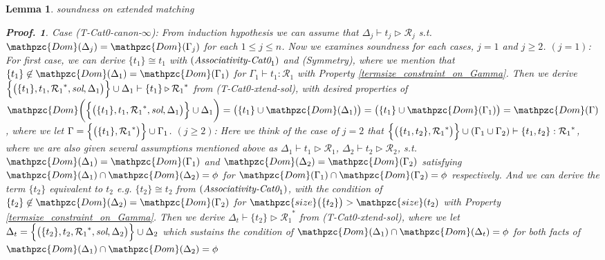 \documentclass[12pt]{article}
\newtheorem{Lemma}{Lemma}[section]
\newtheorem{Proof}{Proof.}
\begin{document}
\begin{Lemma}{soundness on extended matching}
\begin{Proof}
    Case (T-Cat0-canon-$\infty$): From induction hypothesis we can assume
    that $\Delta_j \vdash t_j \triangleright \mathcal{R}_j$ s.t.
    $\mathpzc{Dom}(\Delta_j) = \mathpzc{Dom}(\Gamma_j)$ for each
    $1 \le j \le n$. Now we examines soundness for each cases,
    $j = 1$ and $j \ge 2$.
    $(j = 1)$: For first case, we can derive $\{t_1\} \cong t_1$ with
    $(\text{\it Associativity-Cat0}_1)$ and (Symmetry), where we mention that
    $\{t_1\} \not\in \mathpzc{Dom}(\Delta_1) = \mathpzc{Dom}(\Gamma_1)$ for
    $\Gamma_1 \vdash t_1 : \mathcal{R}_1$ with
    Property \ref{termsize_constraint_on_Gamma}. Then we derive    
    $\Bigl\{\bigl(\{t_1\}, t_1, {\mathcal{R}_1}^*, \text{\it sol}, \Delta_1
    \bigr) \Bigr\} \cup \Delta_1 \vdash \{t_1\}
    \triangleright {\mathcal{R}_1}^*$ from (T-Cat0-xtend-sol),
    with desired properties of
    $\mathpzc{Dom}\biggl(\Bigl\{\bigl(\{t_1\}, t_1, {\mathcal{R}_1}^*,
    \text{\it sol}, \Delta_1 \bigr) \Bigr\} \cup \Delta_1 \biggr) =
    \bigl(\{t_1\} \cup \mathpzc{Dom}(\Delta_1) \bigr) =
    \bigl(\{t_1\} \cup \mathpzc{Dom}(\Gamma_1) \bigr) =
    \mathpzc{Dom}(\Gamma)$, where we let
    $\Gamma = \Bigl\{\bigl(\{t_1\}, {\mathcal{R}_1}^* \bigr) \Bigr\} \cup
    \Gamma_1$.
    $(j \ge 2)$: Here we think of the case of $j = 2$ that
    $\Bigl\{\bigl(\{t_1, t_2\}, {\mathcal{R}_1}^*\bigr) \Bigr\} \cup
    (\Gamma_1 \cup \Gamma_2) \vdash \{t_1, t_2\} : {\mathcal{R}_1}^*$,
    where we are also given several assumptions mentioned above as
    $\Delta_1 \vdash t_1 \triangleright \mathcal{R}_1$,
    $\Delta_2 \vdash t_2 \triangleright \mathcal{R}_2$, s.t.
    $\mathpzc{Dom}(\Delta_1) = \mathpzc{Dom}(\Gamma_1)$ and
    $\mathpzc{Dom}(\Delta_2) = \mathpzc{Dom}(\Gamma_2)$ satisfying
    $\mathpzc{Dom}(\Delta_1) \cap \mathpzc{Dom}(\Delta_2) = \phi$ for
    $\mathpzc{Dom}(\Gamma_1) \cap \mathpzc{Dom}(\Gamma_2) = \phi$
    respectively.
    And we can derive the term $\{t_2\}$ equivalent to $t_2$ e.g.
    $\{t_2\} \cong t_2$ from $(\text{\it Associativity-Cat0}_1)$, with
    the condition of
    $\{t_2\} \not\in \mathpzc{Dom}(\Delta_2) = \mathpzc{Dom}(\Gamma_2)$
    for $\mathpzc{size}\bigl(\{t_2\} \bigr) > \mathpzc{size}(t_2)$ with
    Property \ref{termsize_constraint_on_Gamma}. Then we derive
    $\Delta_t \vdash \{t_2\} \triangleright {\mathcal{R}_1}^*$ from
    (T-Cat0-xtend-sol), where we let
    $\Delta_t = \Bigl\{\bigl(\{t_2\}, t_2, {\mathcal{R}_1}^*,
    \text{\it sol},\Delta_2 \bigr) \Bigr\} \cup \Delta_2$ which sustains
    the condition of
    $\mathpzc{Dom}(\Delta_1) \cap \mathpzc{Dom}(\Delta_t) = \phi$ for both
    facts of $\mathpzc{Dom}(\Delta_1) \cap \mathpzc{Dom}(\Delta_2) = \phi$

\end{Proof}
\end{Lemma}
\end{document}
